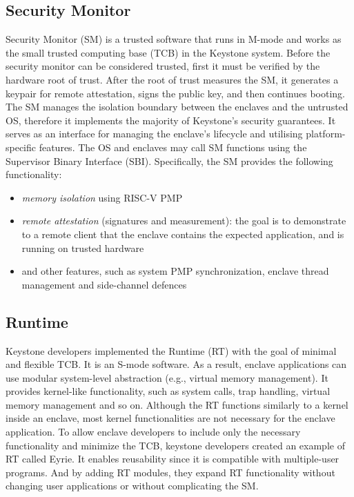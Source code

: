 \subsection{Security Monitor}
Security Monitor (SM) is a trusted software that runs in M-mode and works as the small trusted computing base (TCB) in the Keystone system. Before the security monitor can be considered trusted, first it must be verified by the hardware root of trust. After the root of trust measures the SM, it generates a keypair for remote attestation, signs the public key, and then continues booting. The SM manages the isolation boundary between the enclaves and the untrusted OS, therefore it implements the majority of Keystone's security guarantees.  It serves as an interface for managing the enclave's lifecycle and utilising platform-specific features. The OS and enclaves may call SM functions using the Supervisor Binary Interface (SBI). Specifically, the SM provides the following functionality:
\begin{itemize}
    \item \textit{memory isolation} using RISC-V PMP
    \item \textit{remote attestation} (signatures and measurement): the goal is to demonstrate to a remote client that the enclave contains the expected application, and is running on trusted hardware
    \item and other features, such as system PMP synchronization, enclave thread management and side-channel defences  
\end{itemize}

\subsection{Runtime}
Keystone developers implemented the Runtime (RT) with the goal of minimal and flexible TCB. It is an S-mode software. As a result, enclave applications can use modular system-level abstraction (e.g., virtual memory management). It provides kernel-like functionality, such as system calls, trap handling, virtual memory management and so on. Although the RT functions similarly to a kernel inside an enclave, most kernel functionalities are not necessary for the enclave application. To allow enclave developers to include only the necessary functionality and minimize the TCB, keystone developers created an example of RT called Eyrie. It enables reusability since it is compatible with multiple-user programs. And by adding RT modules, they expand RT functionality without changing user applications or without complicating the SM.

